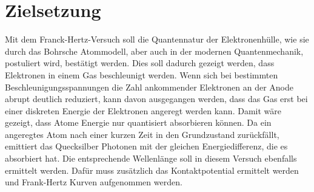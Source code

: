 \section{Zielsetzung}
Mit dem Franck-Hertz-Versuch soll die Quantennatur der Elektronenhülle,
wie sie durch das Bohrsche Atommodell, aber auch in der modernen Quantenmechanik,
postuliert wird, bestätigt werden. Dies soll dadurch gezeigt werden, dass Elektronen
in einem Gas beschleunigt werden. Wenn sich bei bestimmten Beschleunigungsspannungen die Zahl
ankommender Elektronen an der Anode abrupt deutlich reduziert, kann davon ausgegangen werden, dass das Gas erst bei einer diskreten 
Energie der Elektronen angeregt werden kann. Damit wäre gezeigt, dass Atome Energie nur 
quantisiert absorbieren können. Da ein angeregtes Atom nach einer kurzen Zeit in den Grundzustand
zurückfällt, emittiert das Quecksilber Photonen mit der gleichen Energiedifferenz, die es absorbiert hat.
Die entsprechende Wellenlänge soll in diesem Versuch ebenfalls ermittelt werden. Dafür muss zusätzlich das Kontaktpotential 
ermittelt werden und Frank-Hertz Kurven aufgenommen werden.
